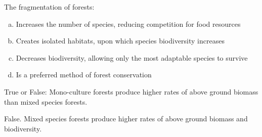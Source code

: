\begin{exercise}
The fragmentation of forests:
\begin{enumerate} [(a)]
\item Increases the number of species, reducing competition for food resources
\item Creates isolated habitats, upon which species biodiversity increases
\item Decreases biodiversity, allowing only the most adaptable species to survive
\item Is a preferred method of forest conservation
\end{enumerate}
\end{exercise}

\begin{exercise}
True or False: Mono-culture forests produce higher rates of above ground biomass than mixed species forests.

False. Mixed species forests produce higher rates of above ground biomass and biodiversity.
\end{exercise}


